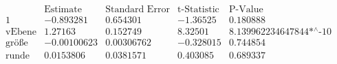 \[\begin{array}{l|llll}
 \text{} & \text{Estimate} & \text{Standard Error} & \text{t-Statistic} & \text{P-Value} \\
\hline
 1 & -0.893281 & 0.654301 & -1.36525 & 0.180888 \\
 \text{vEbene} & 1.27163 & 0.152749 & 8.32501 & \text{8.139962234647844$\grave{ }$*${}^{\wedge}$-10} \\
 \text{gr{\" o}{\ss}e} & -0.00100623 & 0.00306762 & -0.328015 & 0.744854 \\
 \text{runde} & 0.0153806 & 0.0381571 & 0.403085 & 0.689337 \\
\end{array}\]


